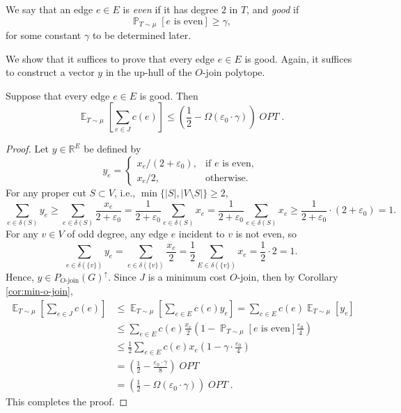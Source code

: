 \documentclass[letterpaper, reqno,12pt]{article}
\newcommand{\RR}{\mathbb{R}}
\newcommand{\PP}{\mathop{{}\mathbb{P}}}
\newcommand{\EE}{\mathop{{}\mathbb{E}}}
\DeclareMathOperator{\OPT}{\mathit{OPT}}
\begin{document}
\begin{definition}
  We say that an edge $e \in E$ is \emph{even} if it has degree $2$ in $T$, and \emph{good} if
  $$ \PP_{T \sim \mu}[\text{$e$ is even}] \geq \gamma, $$
  for some constant $\gamma$ to be determined later.
\end{definition}

We show that it suffices to prove that every edge $e \in E$ is good. Again, it suffices to construct a vector $y$ in the up-hull of the $O$-join polytope.

\begin{lemma} \label{lem:key}
  Suppose that every edge $e \in E$ is good. Then
  $$ \EE_{T \sim \mu}\left[\sum_{e \in J} c(e)\right] \leq \left(\frac{1}{2} - \Omega(\varepsilon_0 \cdot \gamma)\right) \OPT. $$
\end{lemma}

\begin{proof}
  Let $y \in \RR^E$ be defined by
  $$ y_e = \left\{
    \begin{array}{ll}
      x_e/(2 + \varepsilon_0), & \text{if $e$ is even}, \\
      x_e/2, & \text{otherwise}.
    \end{array}
  \right. $$
  For any proper cut $S \subset V$, i.e., $\min\{ |S|, |V \setminus S| \} \geq 2$,
  $$ \sum_{e \in \delta(S)} y_e \geq \sum_{e \in \delta(S)} \frac{x_e}{2 + \varepsilon_0} = \frac{1}{2 + \varepsilon_0} \sum_{e \in \delta(S)} x_e = \frac{1}{2 + \varepsilon_0} \sum_{e \in \delta(S)} x_e \geq \frac{1}{2 + \varepsilon_0} \cdot \left(2 + \varepsilon_0\right) = 1. $$
  For any $v \in V$ of odd degree, any edge $e$ incident to $v$ is not even, so
  $$ \sum_{e \in \delta(\{ v \})} y_e = \sum_{e \in \delta(\{ v \})} \frac{x_e}{2} = \frac{1}{2} \sum_{E \in \delta(\{ v \})} x_e = \frac{1}{2} \cdot 2 = 1. $$
  Hence, $y \in P_\text{$O$-join}(G)^\uparrow$. Since $J$ is a minimum cost $O$-join, then by Corollary \ref{cor:min-o-join},
  \begin{align*}
    \EE_{T \sim \mu}\left[\sum_{e \in J} c(e)\right] &\leq \EE_{T \sim \mu}\left[\sum_{e \in E} c(e) y_e\right] = \sum_{e \in E} c(e) \EE_{T \sim \mu}\left[y_e\right] \\
    &\leq \sum_{e \in E} c(e) \frac{x_e}{2} \left(1 - \PP_{T \sim \mu} \left[\text{$e$ is even}\right] \frac{\varepsilon_0}{4}\right) \\
    &\leq \frac{1}{2}\sum_{e \in E} c(e) x_e \left(1 - \gamma \cdot \frac{\varepsilon_0}{4}\right) \\
    &= \left(\frac{1}{2} - \frac{\varepsilon_0 \cdot \gamma}{8}\right) \OPT \\
    &= \left(\frac{1}{2} - \Omega\left(\varepsilon_0 \cdot \gamma\right)\right) \OPT.
  \end{align*}
  This completes the proof.
\end{proof}
\end{document}
